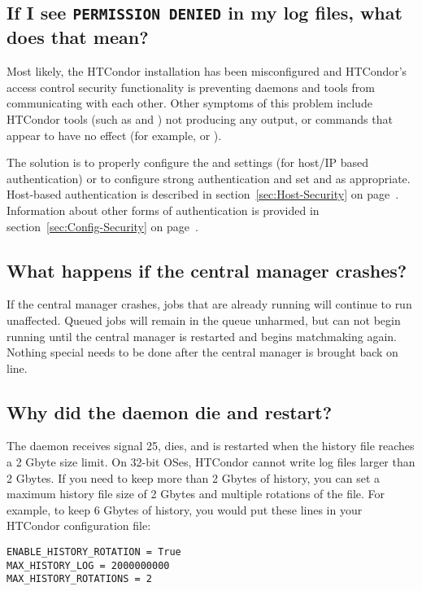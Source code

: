 \subsection*{If I see \texttt{PERMISSION DENIED} in my log files,
what does that mean?}

Most likely, the HTCondor installation has been misconfigured
and HTCondor's access control security functionality is preventing
daemons and tools from communicating with each other.
Other symptoms of this problem include HTCondor tools (such as
 and ) not producing any output, or commands
that appear to have no effect (for example,  or
). 

The solution is to properly configure the  and
 settings (for host/IP based authentication) or to
configure strong authentication and set  and
 as appropriate.
Host-based authentication is described in
section~\ref{sec:Host-Security} on page~\pageref{sec:Host-Security}.
Information about other forms of authentication is provided in 
section~\ref{sec:Config-Security} on page~\pageref{sec:Config-Security}.

\subsection*{What happens if the central manager crashes?}

If the central manager crashes, jobs that are already running will
continue to run unaffected.
Queued jobs will remain in the queue unharmed, but can not begin
running until the central manager is restarted and begins matchmaking
again.
Nothing special needs to be done after the central manager is brought
back on line.

\subsection*{Why did the  daemon die and restart?}

The  daemon receives signal 25,
dies, and is restarted when the
history file reaches a 2 Gbyte size limit.
On 32-bit OSes, HTCondor cannot write log files larger than
2 Gbytes.
If you need to keep more than 2 Gbytes of history, you can set a
maximum history file size of 2 Gbytes and multiple rotations of the
file.
For example, to keep 6 Gbytes of history, you would put these lines in
your HTCondor configuration file:
\begin{verbatim}
ENABLE_HISTORY_ROTATION = True
MAX_HISTORY_LOG = 2000000000
MAX_HISTORY_ROTATIONS = 2
\end{verbatim}

